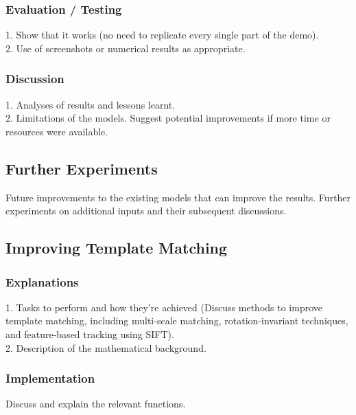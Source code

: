 \documentclass[10pt,twocolumn,letterpaper]{article}
\begin{document}
\subsubsection{Evaluation / Testing}
1. Show that it works (no need to replicate every single part of the demo). \\
2. Use of screenshots or numerical results as appropriate.

\subsubsection{Discussion}
1. Analyses of results and lessons learnt. \\
2. Limitations of the models. Suggest potential improvements if more time or resources were available.

\subsection{Further Experiments}
Future improvements to the existing models that can improve the results. Further experiments on additional inputs and their subsequent discussions.

\subsection{Improving Template Matching}

\subsubsection{Explanations}
1. Tasks to perform and how they're achieved (Discuss methods to improve template matching, including multi-scale matching, rotation-invariant techniques, and feature-based tracking using SIFT). \\
2. Description of the mathematical background.

\subsubsection{Implementation}
Discuss and explain the relevant functions.
\end{document}
